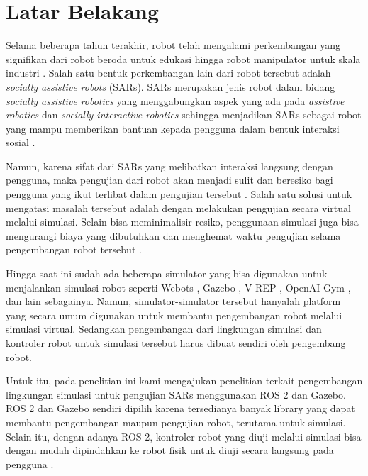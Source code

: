 \section{Latar Belakang}
\label{sec:latarbelakang}

Selama beberapa tahun terakhir, robot telah mengalami perkembangan yang signifikan dari robot beroda untuk edukasi \citep{cit:goncalves2009} hingga robot manipulator untuk skala industri \citep{cit:blatnicky2020}.
Salah satu bentuk perkembangan lain dari robot tersebut adalah \emph{socially assistive robots} (SARs).
SARs merupakan jenis robot dalam bidang \emph{socially assistive robotics} yang menggabungkan aspek yang ada pada \emph{assistive robotics} dan \emph{socially interactive robotics} sehingga menjadikan SARs sebagai robot yang mampu memberikan bantuan kepada pengguna dalam bentuk interaksi sosial \citep{cit:seifer2005}.

Namun, karena sifat dari SARs yang melibatkan interaksi langsung dengan pengguna, maka pengujian dari robot akan menjadi sulit dan beresiko bagi pengguna yang ikut terlibat dalam pengujian tersebut \citep{cit:erickson2020}.
Salah satu solusi untuk mengatasi masalah tersebut adalah dengan melakukan pengujian secara virtual melalui simulasi.
Selain bisa meminimalisir resiko, penggunaan simulasi juga bisa mengurangi biaya yang dibutuhkan dan menghemat waktu pengujian selama pengembangan robot tersebut \citep{cit:takaya2016}.

Hingga saat ini sudah ada beberapa simulator yang bisa digunakan untuk menjalankan simulasi robot seperti Webots \citep{cit:michel2004}, Gazebo \citep{cit:koenig2004}, V-REP \citep{cit:rohmer2013}, OpenAI Gym \citep{cit:brockman2016}, dan lain sebagainya.
Namun, simulator-simulator tersebut hanyalah platform yang secara umum digunakan untuk membantu pengembangan robot melalui simulasi virtual.
Sedangkan pengembangan dari lingkungan simulasi dan kontroler robot untuk simulasi tersebut harus dibuat sendiri oleh pengembang robot.

Untuk itu, pada penelitian ini kami mengajukan penelitian terkait pengembangan lingkungan simulasi untuk pengujian SARs menggunakan ROS 2 dan Gazebo.
ROS 2 dan Gazebo sendiri dipilih karena tersedianya banyak library yang dapat membantu pengembangan maupun pengujian robot, terutama untuk simulasi.
Selain itu, dengan adanya ROS 2, kontroler robot yang diuji melalui simulasi bisa dengan mudah dipindahkan ke robot fisik untuk diuji secara langsung pada pengguna \citep{cit:takaya2016}.
